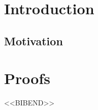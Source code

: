 
\frontmatter
\maketitle
\tableofcontents

\mainmatter
\chapter{Introduction}
\chaptertoc

\section{Motivation}

\appendix
\chapter{Proofs}

\backmatter
<<BIBEND>>
